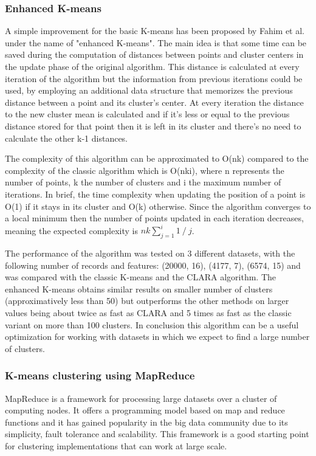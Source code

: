 \documentclass[12pt]{article}
\begin{document}
	\subsubsection{Enhanced K-means}
	A simple improvement for the basic K-means has been proposed by Fahim et al.\cite{EfficientEnhancedKmeans} under the name of "enhanced K-means". The main idea is that some time can be saved during the computation of distances between points and cluster centers in the update phase of the original algorithm. This distance is calculated at every iteration of the algorithm but the information from previous iterations could be used, by employing an additional data structure that memorizes the previous distance between a point and its cluster's center. At every iteration the distance to the new cluster mean is calculated and if it's less or equal to the previous distance stored for that point then it is left in its cluster and there's no need to calculate the other k-1 distances.
	
	The complexity of this algorithm can be approximated to O(nk) compared to the complexity of the classic algorithm which is O(nki), where n represents the number of points, k the number of clusters and i the maximum number of iterations. In brief, the time complexity when updating the position of a point is O(1) if it stays in its cluster and O(k) otherwise. Since the algorithm converges to a local minimum then the number of points updated in each iteration decreases, meaning the expected complexity is \( nk\sum_{j=1}^{i}1\mathbin{/}j \).
	
	The performance of the algorithm was tested on 3 different datasets, with the following number of records and features: (20000, 16), (4177, 7), (6574, 15) and was compared with the classic K-means and the CLARA algorithm. The enhanced K-means obtains similar results on smaller number of clusters (approximatively less than 50) but outperforms the other methods on larger values being about twice as fast as CLARA and 5 times as fast as the classic variant on more than 100 clusters. In conclusion this algorithm can be a useful optimization for working with datasets in which we expect to find a large number of clusters.
	
	\subsubsection{K-means clustering using MapReduce}
	MapReduce\cite{MapReduce} is a framework for processing large datasets over a cluster of computing nodes. It offers a programming model based on map and reduce functions and it has gained popularity in the big data community due to its simplicity, fault tolerance and scalability. This framework is a good starting point for clustering implementations that can work at large scale.
	
\end{document}
